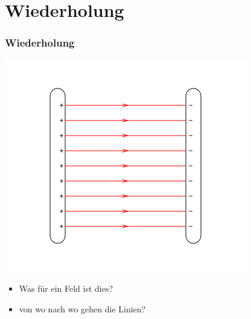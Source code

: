 


\subtitle{Technik A08: \\
Das elektromagnetische Feld \\[2em]}
\date{Stand 02.06.2016}


\section*{Wiederholung}

\begin{frame}
  \frametitle{Wiederholung}
  \begin{center}
    \includegraphics[width=\textwidth,height=.6\textheight,keepaspectratio]{e08/PlattenkondensatorFeld.png}\\
    \begin{itemize}
      \item Was für ein Feld ist dies?
      \item von wo nach wo gehen die Linien?
    \end{itemize}
  \end{center}
\end{frame}

